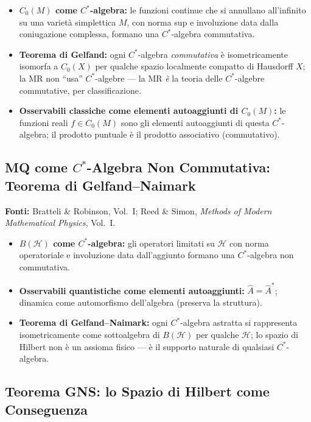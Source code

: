 \documentclass[12pt, a4paper]{article}
\newcommand{\fonti}[1]{%
	\begin{fontebox}
		\textcolor{fontecolor}{\footnotesize\textbf{Fonti:} #1}
	\end{fontebox}%
}
\begin{document}
	\begin{itemize}
		\item \textbf{$C_0(M)$ come $C^*$-algebra:} le funzioni continue che si
		annullano all'infinito su una varietà simplettica $M$, con norma sup e
		involuzione data dalla coniugazione complessa, formano una $C^*$-algebra
		commutativa.
		\item \textbf{Teorema di Gelfand:} ogni $C^*$-algebra \emph{commutativa} è
		isometricamente isomorfa a $C_0(X)$ per qualche spazio localmente compatto
		di Hausdorff $X$; la MR non ``usa'' $C^*$-algebre --- la MR \emph{è} la
		teoria delle $C^*$-algebre commutative, per classificazione.
		\item \textbf{Osservabili classiche come elementi autoaggiunti di $C_0(M)$:}
		le funzioni reali $f \in C_0(M)$ sono gli elementi autoaggiunti di questa
		$C^*$-algebra; il prodotto puntuale è il prodotto associativo (commutativo).
	\end{itemize}
	
	\subsection{MQ come $C^*$-Algebra Non Commutativa: Teorema di Gelfand--Naimark}
	
	\fonti{Bratteli \& Robinson, Vol.~I; Reed \& Simon, \textit{Methods of Modern
			Mathematical Physics}, Vol.~I.}
	
	\begin{itemize}
		\item \textbf{$B(\mathcal{H})$ come $C^*$-algebra:} gli operatori limitati su
		$\mathcal{H}$ con norma operatoriale e involuzione data dall'aggiunto formano
		una $C^*$-algebra non commutativa.
		\item \textbf{Osservabili quantistiche come elementi autoaggiunti:} $\hat{A} =
		\hat{A}^*$; dinamica come automorfismo dell'algebra (preserva la struttura).
		\item \textbf{Teorema di Gelfand--Naimark:} ogni $C^*$-algebra astratta si
		rappresenta isometricamente come sottoalgebra di $B(\mathcal{H})$ per qualche
		$\mathcal{H}$; lo spazio di Hilbert non è un assioma fisico --- è il supporto
		naturale di qualsiasi $C^*$-algebra.
	\end{itemize}
	
	\subsection{Teorema GNS: lo Spazio di Hilbert come Conseguenza}
	
\end{document}
